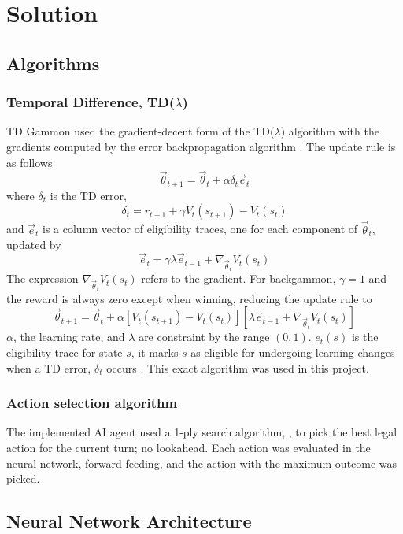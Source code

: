 \documentclass[12pt,a4paper]{article}
\begin{document}
\section{Solution}
\subsection{Algorithms}
\subsubsection{Temporal Difference, TD($\lambda$)}
TD Gammon used the gradient-decent form of the TD($\lambda$) algorithm with the gradients computed by the error backpropagation algorithm \cite{rl}. The update rule is as follows
$$\vec{\theta}_{t+1} = \vec{\theta}_{t} + \alpha\delta_t\vec{e}_{t}$$ 
where $\delta_t$ is the TD error,
$$\delta_{t} = r_{t+1} + \gamma V_t(s_{t+1}) - V_t(s_t)$$ 
and $\vec{e}_t$ is a column vector of eligibility traces, one for each component of $\vec{\theta}_t$, updated by 
$$\vec{e}_{t} = \gamma\lambda\vec{e}_{t-1} + \nabla_{\vec{\theta}_{t}}V_t(s_t)$$ 
The expression $\nabla_{\vec{\theta}_{t}}V_t(s_t)$ refers to the gradient. For backgammon, $\gamma=1$ and the reward is always zero except when winning, reducing the update rule to
$$\vec{\theta}_{t+1} = \vec{\theta}_{t} + \alpha[V_t(s_{t+1}) - V_t(s_t)][\lambda\vec{e}_{t-1} + \nabla_{\vec{\theta}_{t}}V_t(s_t)]$$
$\alpha$, the learning rate, and $\lambda$ are constraint by the range $(0,1)$. $e_t(s)$ is the eligibility trace for state $s$, it marks $s$ as eligible for undergoing learning changes when a TD error, $\delta_t$ occurs \cite{rl}. This exact algorithm was used in this project.

\subsubsection{Action selection algorithm}
The implemented AI agent used a 1-ply search algorithm, \cite{DBLP:conf/icml/Tesauro92}, to pick the best legal action for the current turn; no lookahead. Each action was evaluated in the neural network, forward feeding, and the action with the maximum outcome was picked. 

\subsection{Neural Network Architecture}
\end{document}
